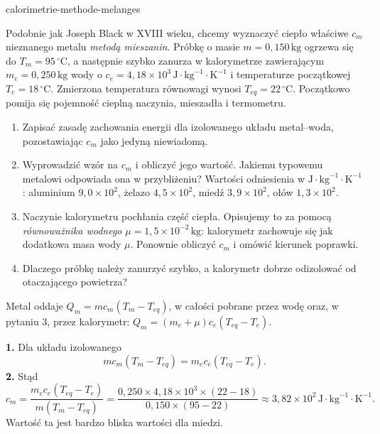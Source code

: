 \begin{exo}{calorimetrie-methode-melanges}

Podobnie jak Joseph Black w XVIII wieku, chcemy wyznaczyć ciepło właściwe $c_m$ nieznanego metalu \emph{metodą mieszanin}. Próbkę o masie $m=0{,}150\,\text{kg}$ ogrzewa się do $T_m=95\,^\circ\text{C}$, a następnie szybko zanurza w kalorymetrze zawierającym $m_e=0{,}250\,\text{kg}$ wody o $c_e=4{,}18\times10^3\,\text{J}\!\cdot\!\text{kg}^{-1}\!\cdot\!\text{K}^{-1}$ i temperaturze początkowej $T_e=18\,^\circ\text{C}$. Zmierzona temperatura równowagi wynosi $T_{eq}=22\,^\circ\text{C}$. Początkowo pomija się pojemność cieplną naczynia, mieszadła i termometru.

\begin{enumerate}
  \item Zapisać zasadę zachowania energii dla izolowanego układu metal–woda, pozostawiając $c_m$ jako jedyną niewiadomą.
  \item Wyprowadzić wzór na $c_m$ i obliczyć jego wartość. Jakiemu typowemu metalowi odpowiada ona w przybliżeniu? Wartości odniesienia w $\text{J}\!\cdot\!\text{kg}^{-1}\!\cdot\!\text{K}^{-1}$: aluminium $9{,}0\times10^2$, żelazo $4{,}5\times10^2$, miedź $3{,}9\times10^2$, ołów $1{,}3\times10^2$.
  \item Naczynie kalorymetru pochłania część ciepła. Opisujemy to za pomocą \emph{równoważnika wodnego} $\mu=1{,}5\times10^{-2}\,\text{kg}$: kalorymetr zachowuje się jak dodatkowa masa wody $\mu$. Ponownie obliczyć $c_m$ i omówić kierunek poprawki.
  \item Dlaczego próbkę należy zanurzyć szybko, a kalorymetr dobrze odizolować od otaczającego powietrza?
\end{enumerate}

\begin{indication}
Metal oddaje $Q_m=mc_m(T_m-T_{eq})$, w całości pobrane przez wodę oraz, w pytaniu 3, przez kalorymetr: $Q_m=(m_e+\mu)c_e(T_{eq}-T_e)$.
\end{indication}

\begin{solution}
\textbf{1.} Dla układu izolowanego
\[
mc_m(T_m-T_{eq})=m_ec_e(T_{eq}-T_e).
\]
\textbf{2.} Stąd
\[
c_m=\frac{m_ec_e(T_{eq}-T_e)}{m(T_m-T_{eq})}
=\frac{0{,}250\times4{,}18\times10^3\times(22-18)}{0{,}150\times(95-22)}
\approx3{,}82\times10^2\,\text{J}\!\cdot\!\text{kg}^{-1}\!\cdot\!\text{K}^{-1}.
\]
Wartość ta jest bardzo bliska wartości dla miedzi.


\end{solution}
\end{exo}
